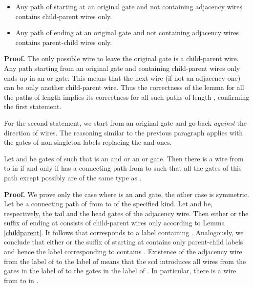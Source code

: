 \documentclass{llncs}
\begin{document}
\begin{lemma} \label{childparent}

\begin{itemize}
\item Any path  of  starting at an original gate and not containing adjacency wires contains
child-parent wires only.
\item Any path  of  ending at an original gate and not containing adjacency wires contains
parent-child wires only. 
\end{itemize}

\end{lemma}

{\bf Proof.}
The only possible wire to leave the original gate is a child-parent wire.
Any path starting from an original gate and containing child-parent wires only 
ends up in an  or  gate.  This means that the next wire (if not an adjacency one)
can be only another child-parent wire. Thus the correctness of the lemma for all
the paths of length  implies its correctness for all such paths of length ,
confirming the first statement. 

For the second statement, we start from an original gate and go back \emph{against}
the direction of wires. The reasoning similar to the previous paragraph applies 
with the  gates of non-singleton labels replacing the  and  ones.
  

\begin{lemma} \label{andconnect}
Let  and  be gates of  such that  is an {\sc and} or
an {\sc or} 
gate. Then there is a wire from  to  in  if and only if
 has a connecting path from  to  
such that all the gates of this path except possibly  are of the same type
as .
\end{lemma}

{\bf Proof.}
We prove only the case where  is an {\sc and} gate, the other case is symmetric. 
Let  be a connecting path of  from  to  of the specified kind. Let  and  be, respectively, the tail and the head gates of the adjacency wire. Then either 
 or the suffix of  ending at  consists
of child-parent wires only according to Lemma \ref{childparent}.
It follows that  corresponds to a label containing . Analogously, we conclude that either  or the suffix of  starting at  contains only parent-child labels and hence the label corresponding to  contains . Existence of the adjacency wire from the label of  to the label of  means that the {\sc scd} introduces all wires from the 
gates in the label of  to the gates in the label of . In particular, there is a wire from  to  in . 
\end{document}
